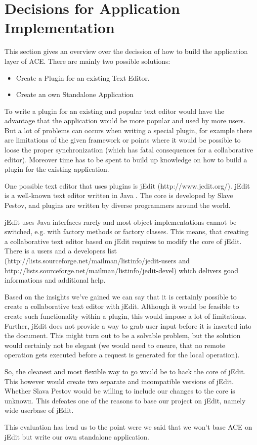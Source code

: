 \chapter{Decisions for Application Implementation}
\label{chapter:decisionsapplication}

This section gives an overview over the decission of how to build the application layer of ACE. There are mainly two possible solutions:
\begin{itemize}
\item Create a Plugin for an existing Text Editor.
\item Create an own Standalone Application
\end{itemize}
To write a plugin for an existing and popular text editor would have the advantage that the application would be more popular and used by more users. But a lot of problems can occurs when writing a special plugin, for example there are limitations of the given framework or points where it would be possible to loose the proper synchronization (which has fatal consequences for a collaborative editor). Moreover time has to be spent to build up knowledge on how to build a plugin for the existing application.

One possible text editor that uses plugins is jEdit (http://www.jedit.org/). jEdit is a well-known text editor written in Java . The core is developed by Slave Pestov, and plugins are written by diverse programmers around the world.

jEdit uses Java interfaces rarely and most object implementations cannot be switched, e.g. with factory methods or factory classes. This means, that creating a collaborative text editor based on jEdit requires to modify the core of jEdit. There is a users and a developers list (http://lists.sourceforge.net/mailman/listinfo/jedit-users and http://lists.sourceforge.net/mailman/listinfo/jedit-devel) which delivers good informations and additional help.

Based on the insights we've gained we can say that it is certainly possible to create a collaborative text editor with jEdit. Although it would be feasible to create such functionality within a plugin, this would impose a lot of limitations. Further, jEdit does not provide a way to grab user input before it is inserted into the document. This might turn out to be a solvable problem, but the solution would certainly not be elegant (we would need to ensure, that no remote operation gets executed before a request is generated for the local operation).

So, the cleanest and most flexible way to go would be to hack the core of jEdit. This however would create two separate and incompatible versions of jEdit. Whether Slava Pestov would be willing to include our changes to the core is unknown. This defeates one of the reasons to base our project on jEdit, namely wide userbase of jEdit.

This evaluation has lead us to the point were we said that we won't base ACE on jEdit but write our own standalone application.
